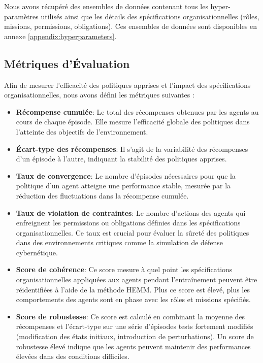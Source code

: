 \documentclass[sigconf,anonymous]{aamas}
\begin{document}
Nous avons récupéré des ensembles de données contenant tous les hyper-paramètres utilisés ainsi que les détails des spécifications organisationnelles (rôles, missions, permissions, obligations). Ces ensembles de données sont disponibles en annexe \ref{appendix:hyperparameters}.

\subsection{Métriques d'Évaluation}

Afin de mesurer l'efficacité des politiques apprises et l'impact des spécifications organisationnelles, nous avons défini les métriques suivantes :

\begin{itemize}
    \item \textbf{Récompense cumulée}: Le total des récompenses obtenues par les agents au cours de chaque épisode. Elle mesure l'efficacité globale des politiques dans l'atteinte des objectifs de l'environnement.
    
    \item \textbf{Écart-type des récompenses}: Il s'agit de la variabilité des récompenses d'un épisode à l'autre, indiquant la stabilité des politiques apprises.
    
    \item \textbf{Taux de convergence}: Le nombre d'épisodes nécessaires pour que la politique d'un agent atteigne une performance stable, mesurée par la réduction des fluctuations dans la récompense cumulée.
    
    \item \textbf{Taux de violation de contraintes}: Le nombre d'actions des agents qui enfreignent les permissions ou obligations définies dans les spécifications organisationnelles. Ce taux est crucial pour évaluer la sûreté des politiques dans des environnements critiques comme la simulation de défense cybernétique.
    
    \item \textbf{Score de cohérence}: Ce score mesure à quel point les spécifications organisationnelles appliquées aux agents pendant l'entraînement peuvent être réidentifiées à l'aide de la méthode HEMM. Plus ce score est élevé, plus les comportements des agents sont en phase avec les rôles et missions spécifiés.
    
    \item \textbf{Score de robustesse}: Ce score est calculé en combinant la moyenne des récompenses et l'écart-type sur une série d'épisodes tests fortement modifiés (modification des états initiaux, introduction de perturbations). Un score de robustesse élevé indique que les agents peuvent maintenir des performances élevées dans des conditions difficiles.

\end{itemize}
\end{document}
